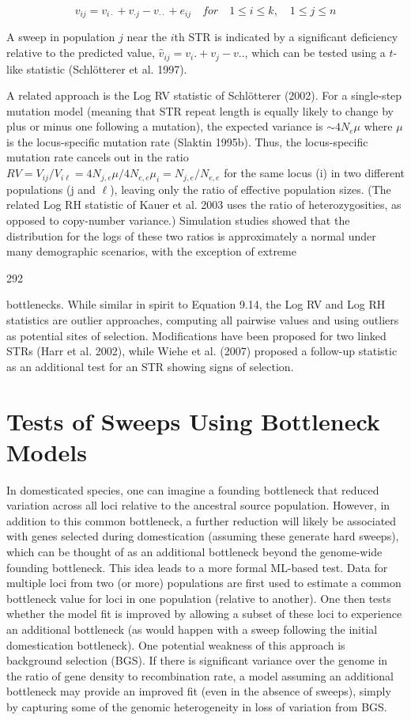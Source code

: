 \documentclass{article}
\begin{document}
\begin{equation}
v_{ij}=v_{i\cdot}+v_{\cdot j}-v_{\cdot\cdot}+e_{ij}\quad for\quad1\leq i\leq k,\quad1\leq j\leq n
\tag{9.14}
\label{eq:9_14}
\end{equation}

A sweep in population $j$ near the $i$th STR is indicated by a significant deficiency relative to the predicted value, $\widehat{v}_{ij} = v_{i}. + v_{j} - v..$, which can be tested using a $t$-like statistic (Schlötterer et al. 1997).

A related approach is the Log RV statistic of Schlötterer (2002). For a single-step mutation model (meaning that STR repeat length is equally likely to change by plus or minus one following a mutation), the expected variance is  $ \sim 4N_{e}\mu $ where  $ \mu $ is the locus-specific mutation rate (Slaktin 1995b). Thus, the locus-specific mutation rate cancels out in the ratio  $ RV = V_{ij}/V_{i\ell} = 4N_{j,e}\mu/4N_{e,e}\mu_i = N_{j,e}/N_{e,e} $ for the same locus (i) in two different populations (j and  $ \ell $), leaving only the ratio of effective population sizes. (The related Log RH statistic of Kauer et al. 2003 uses the ratio of heterozygosities, as opposed to copy-number variance.) Simulation studies showed that the distribution for the logs of these two ratios is approximately a normal under many demographic scenarios, with the exception of extreme

292

bottlenecks. While similar in spirit to Equation 9.14, the Log RV and Log RH statistics are outlier approaches, computing all pairwise values and using outliers as potential sites of selection. Modifications have been proposed for two linked STRs (Harr et al. 2002), while Wiehe et al. (2007) proposed a follow-up statistic as an additional test for an STR showing signs of selection.

\section{Tests of Sweeps Using Bottleneck Models}
In domesticated species, one can imagine a founding bottleneck that reduced variation across all loci relative to the ancestral source population. However, in addition to this common bottleneck, a further reduction will likely be associated with genes selected during domestication (assuming these generate hard sweeps), which can be thought of as an additional bottleneck beyond the genome-wide founding bottleneck. This idea leads to a more formal ML-based test. Data for multiple loci from two (or more) populations are first used to estimate a common bottleneck value for loci in one population (relative to another). One then tests whether the model fit is improved by allowing a subset of these loci to experience an additional bottleneck (as would happen with a sweep following the initial domestication bottleneck). One potential weakness of this approach is background selection (BGS). If there is significant variance over the genome in the ratio of gene density to recombination rate, a model assuming an additional bottleneck may provide an improved fit (even in the absence of sweeps), simply by capturing some of the genomic heterogeneity in loss of variation from BGS.
\end{document}
